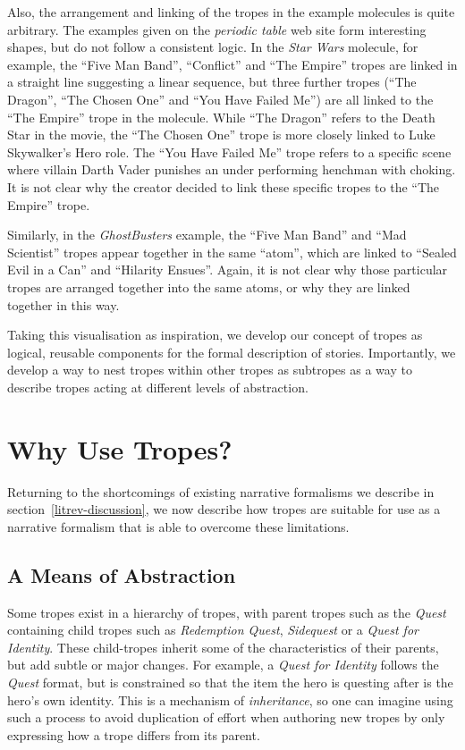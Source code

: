 Also, the arrangement and linking of the tropes in the example molecules is
quite arbitrary. The examples given on the \emph{periodic table} web site form
interesting shapes, but do not follow a consistent logic. In the \emph{Star
  Wars} molecule, for example, the ``Five Man Band'', ``Conflict'' and ``The
Empire'' tropes are linked in a straight line suggesting a linear sequence, but
three further tropes (``The Dragon'', ``The Chosen One'' and ``You Have Failed
Me'') are all linked to the ``The Empire'' trope in the molecule. While ``The
Dragon'' refers to the Death Star in the movie, the ``The Chosen One'' trope is
more closely linked to Luke Skywalker's Hero role. The ``You Have Failed Me''
trope refers to a specific scene where villain Darth Vader punishes an
under performing henchman with choking. It is not clear why the creator decided
to link these specific tropes to the ``The Empire''
trope.

Similarly, in the \emph{GhostBusters} example, the ``Five Man Band'' and ``Mad
Scientist'' tropes appear together in the same ``atom'', which are linked to
``Sealed Evil in a Can'' and ``Hilarity Ensues''. Again, it is not clear why
those particular tropes are arranged together into the same atoms, or why they
are linked together in this way.

Taking this visualisation as inspiration, we develop our concept of tropes as
logical, reusable components for the formal description of stories. Importantly,
we develop a way to nest tropes within other tropes as subtropes as a way to
describe tropes acting at different levels of abstraction.

\section{Why Use Tropes?}

Returning to the shortcomings of existing narrative formalisms we describe in
section~\ref{litrev-discussion}, we now describe how tropes are suitable for use
as a narrative formalism that is able to overcome these limitations.

\subsection{A Means of Abstraction}
Some tropes exist in a hierarchy of tropes, with parent tropes such as the
\emph{Quest} containing child tropes such as \emph{Redemption Quest},
\emph{Sidequest} or a \emph{Quest for Identity}. These child-tropes inherit some
of the characteristics of their parents, but add subtle or major changes. For
example, a \emph{Quest for Identity} follows the \emph{Quest} format, but is
constrained so that the item the hero is questing after is the hero's own
identity. This is a mechanism of \emph{inheritance}, so one can imagine using
such a process to avoid duplication of effort when authoring new tropes by only
expressing how a trope differs from its parent.


